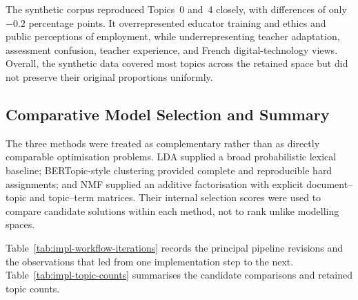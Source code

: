 The synthetic corpus reproduced Topics~0 and~4 closely, with differences of only
$-0.2$ percentage points. It overrepresented educator training and ethics and public
perceptions of employment, while underrepresenting teacher adaptation, assessment
confusion, teacher experience, and French digital-technology views. Overall, the
synthetic data covered most topics across the retained space but did not preserve
their original proportions uniformly.

\subsection{Comparative Model Selection and Summary}

The three methods were treated as complementary rather than as directly comparable
optimisation problems. LDA supplied a broad probabilistic lexical baseline;
BERTopic-style clustering provided complete and reproducible hard assignments; and
NMF supplied an additive factorisation with explicit document--topic and topic--term
matrices. Their internal selection scores were used to compare candidate solutions
within each method, not to rank unlike modelling spaces.

Table~\ref{tab:impl-workflow-iterations} records the principal pipeline revisions and
the observations that led from one implementation step to the next. Table~\ref{tab:impl-topic-counts} summarises the candidate comparisons and retained
topic counts.

